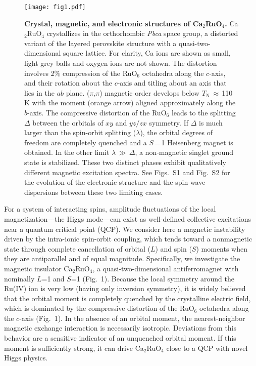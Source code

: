 \documentclass[twocolumn,prb,aps,showpacs]{revtex4-1}
\newcommand{\CRO}{{Ca$_2$RuO$_4$} }
\newcommand{\CROns}{Ca$_2$RuO$_4$}
\begin{document}
\begin{figure}
\centerline{\texttt{[image: fig1.pdf]}}
\caption{{\bf Crystal, magnetic, and electronic structures of \CROns.} \CRO crystallizes in the orthorhombic {\it Pbca} space group, a distorted variant of the layered perovskite structure with a quasi-two-dimensional square lattice. For clarity, Ca ions are shown as small, light grey balls and oxygen ions are not shown. The distortion involves 2$\%$ compression of the RuO$_6$ octahedra along the $c$-axis, and their rotation about the $c$-axis and titling about an axis that lies in the $ab$ plane\cite{Braden_1998,Friedt2001}. ($\pi$,$\pi$) magnetic order develops below $T_\mathrm{N}$\,$\approx$\,110 K with the moment (orange arrow) aligned approximately along the $b$-axis. The compressive distortion of the RuO$_6$ leads to the splitting $\Delta$ between the orbitals of $xy$ and $yz/zx$ symmetry. If $\Delta$ is much larger than the spin-orbit splitting ($\lambda$), the orbital degrees of freedom are completely quenched and a $S$\,=\,1 Heisenberg magnet is obtained. In the other limit $\lambda$\,$\gg$\,$\Delta$, a non-magnetic singlet ground state is stabilized. These two distinct phases exhibit qualitatively different magnetic excitation spectra. See Figs.~S1 and Fig.~S2 for the evolution of the electronic structure and the spin-wave dispersions between these two limiting cases.}\label{fig:fig1}
\end{figure}

For a system of interacting spins, amplitude fluctuations of the local magnetization---the Higgs mode---can exist as well-defined collective excitations near a quantum critical point (QCP). We consider here a magnetic instability driven by the intra-ionic spin-orbit coupling, which tends toward a nonmagnetic state through complete cancellation of orbital ($L$) and spin ($S$) moments when they are antiparallel and of equal magnitude\cite{Khaliullin_2013,
Meetei_2015}. Specifically, we investigate the magnetic insulator \CROns, a quasi-two-dimensional antiferromagnet \cite{Nakatsuji_1997} with nominally $L$=1 and $S$=1 (Fig.~1). Because the local symmetry around the Ru(IV) ion is very low\cite{Braden_1998,Friedt2001} (having only inversion symmetry), it is widely believed that the orbital moment is completely quenched by the crystalline electric field\cite{Anisimov_2002,Fang2004,Liebsch_2007,Gorelov_2010}, which is dominated by the compressive distortion of the RuO$_6$ octahedra along the $c$-axis (Fig.~1). In the absence of an orbital moment, the nearest-neighbor magnetic exchange interaction is necessarily isotropic. Deviations from this behavior are a sensitive indicator of an unquenched orbital moment. If this moment is sufficiently strong, it can drive \CRO close to a QCP with novel Higgs physics.
\end{document}

